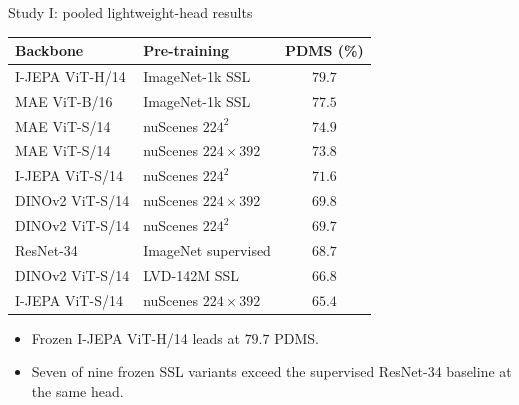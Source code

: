 \documentclass[aspectratio=169, xcolor={table}]{beamer}
\begin{document}
\begin{frame}{Study I: pooled lightweight-head results}
  \centering\scriptsize
  \begin{tabular}{@{}l l c@{}}
    \toprule
    \textbf{Backbone} & \textbf{Pre-training} & \textbf{PDMS (\%)} \\
    \midrule
    \textcolor{ssl}{I-JEPA ViT-H/14}  & ImageNet-1k SSL            & $\mathbf{79.7}$ \\
    MAE ViT-B/16                       & ImageNet-1k SSL            & $77.5$ \\
    MAE ViT-S/14                       & nuScenes $224^{2}$         & $74.9$ \\
    MAE ViT-S/14                       & nuScenes $224{\times}392$  & $73.8$ \\
    I-JEPA ViT-S/14                    & nuScenes $224^{2}$         & $71.6$ \\
    DINOv2 ViT-S/14                    & nuScenes $224{\times}392$  & $69.8$ \\
    DINOv2 ViT-S/14                    & nuScenes $224^{2}$         & $69.7$ \\
    \rowcolor{gray!12}
    \textcolor{sup}{ResNet-34}         & ImageNet supervised        & $68.7$ \\
    DINOv2 ViT-S/14                    & LVD-142M SSL               & $66.8$ \\
    I-JEPA ViT-S/14                    & nuScenes $224{\times}392$  & $65.4$ \\
    \bottomrule
  \end{tabular}
  \vspace{8pt}
  \begin{itemize}\footnotesize
    \item Frozen I-JEPA ViT-H/14 leads at $79.7$ PDMS.
    \item Seven of nine frozen SSL variants exceed the supervised ResNet-34 baseline at the same head.
  \end{itemize}
\end{frame}
\end{document}
